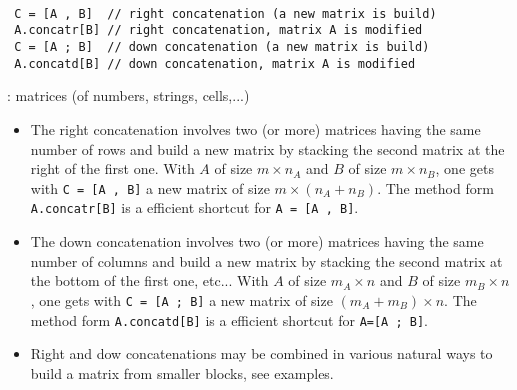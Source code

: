 
\begin{mandesc}
   \\
   \\   
   \\   
\end{mandesc}

\begin{calling_sequence}
\begin{verbatim}
 C = [A , B]  // right concatenation (a new matrix is build)
 A.concatr[B] // right concatenation, matrix A is modified
 C = [A ; B]  // down concatenation (a new matrix is build)
 A.concatd[B] // down concatenation, matrix A is modified
\end{verbatim}
\end{calling_sequence}

\begin{parameters}
  \begin{varlist}
   : matrices (of numbers, strings, cells,...)
  \end{varlist}
\end{parameters}

\begin{mandescription}
\begin{itemize}
\item The right concatenation involves two (or more) matrices having the same number of rows
      and build a new matrix by stacking the second matrix at the right of the first one.
      With $A$ of size $m \times n_A$ and $B$ of size $m \times n_B$, one gets
      with \verb+C = [A , B]+ a new matrix of size $m \times (n_A + n_B)$. The method 
      form \verb+A.concatr[B]+ is a efficient shortcut for  \verb+A = [A , B]+.
\item The down concatenation involves two (or more) matrices having the same number of columns
      and build a new matrix by stacking the second matrix at the bottom of the first one, etc...
      With $A$ of size $m_A \times n$ and $B$ of size $m_B \times n$, one gets
      with \verb+C = [A ; B]+ a new matrix of size $(m_A + m_B) \times n$. The method form 
      \verb+A.concatd[B]+ is a efficient shortcut for  \verb+A=[A ; B]+.
\item Right and dow concatenations may be combined in various natural ways to build a matrix
      from smaller blocks, see examples.
\end{itemize}

\end{mandescription}


